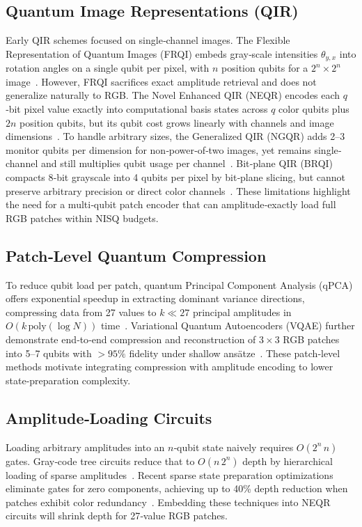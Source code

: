 \documentclass[onecolumn,12pt]{IEEEtran}
\begin{document}
\subsection{Quantum Image Representations (QIR)}
Early QIR schemes focused on single‐channel images. The Flexible Representation of Quantum Images (FRQI) embeds gray‐scale intensities $\theta_{y,x}$ into rotation angles on a single qubit per pixel, with $n$ position qubits for a $2^n\times2^n$ image~\cite{le2011frqi}. However, FRQI sacrifices exact amplitude retrieval and does not generalize naturally to RGB. The Novel Enhanced QIR (NEQR) encodes each $q$‐bit pixel value exactly into computational basis states across $q$ color qubits plus $2n$ position qubits, but its qubit cost grows linearly with channels and image dimensions~\cite{zhang2013neqr}. To handle arbitrary sizes, the Generalized QIR (NGQR) adds 2–3 monitor qubits per dimension for non‐power‐of‐two images, yet remains single‐channel and still multiplies qubit usage per channel~\cite{xing2024ngqr}. Bit‐plane QIR (BRQI) compacts 8‐bit grayscale into 4 qubits per pixel by bit‐plane slicing, but cannot preserve arbitrary precision or direct color channels~\cite{li2018bitplane}. These limitations highlight the need for a multi‐qubit patch encoder that can amplitude‐exactly load full RGB patches within NISQ budgets.

\subsection{Patch‐Level Quantum Compression}
To reduce qubit load per patch, quantum Principal Component Analysis (qPCA) offers exponential speedup in extracting dominant variance directions, compressing data from 27 values to $k\ll 27$ principal amplitudes in $O(k\,\mathrm{poly}(\log N))$ time~\cite{yu2019quantum}. Variational Quantum Autoencoders (VQAE) further demonstrate end‐to‐end compression and reconstruction of $3\times3$ RGB patches into 5–7 qubits with $>95\%$ fidelity under shallow ansätze~\cite{romero2017quantum}. These patch‐level methods motivate integrating compression with amplitude encoding to lower state‐preparation complexity.

\subsection{Amplitude‐Loading Circuits}
Loading arbitrary amplitudes into an $n$‐qubit state naively requires $O(2^n\,n)$ gates. Gray‐code tree circuits reduce that to $O(n\,2^n)$ depth by hierarchical loading of sparse amplitudes~\cite{plessch2011quantum}. Recent sparse state preparation optimizations eliminate gates for zero components, achieving up to 40\% depth reduction when patches exhibit color redundancy~\cite{zalka1999grover}. Embedding these techniques into NEQR circuits will shrink depth for 27‐value RGB patches.
\end{document}
